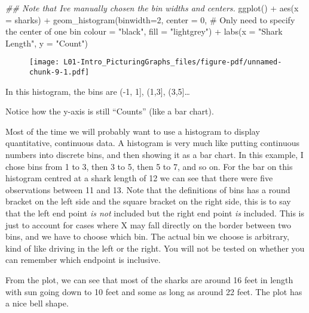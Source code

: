 \documentclass[
  letterpaper,
  DIV=11,
  numbers=noendperiod]{scrreprt}
\newenvironment{Shaded}{\begin{snugshade}}{\end{snugshade}}
\newcommand{\AttributeTok}[1]{\textcolor[rgb]{0.40,0.45,0.13}{#1}}
\newcommand{\CommentTok}[1]{\textcolor[rgb]{0.37,0.37,0.37}{#1}}
\newcommand{\DecValTok}[1]{\textcolor[rgb]{0.68,0.00,0.00}{#1}}
\newcommand{\DocumentationTok}[1]{\textcolor[rgb]{0.37,0.37,0.37}{\textit{#1}}}
\newcommand{\FunctionTok}[1]{\textcolor[rgb]{0.28,0.35,0.67}{#1}}
\newcommand{\NormalTok}[1]{\textcolor[rgb]{0.00,0.23,0.31}{#1}}
\newcommand{\SpecialCharTok}[1]{\textcolor[rgb]{0.37,0.37,0.37}{#1}}
\newcommand{\StringTok}[1]{\textcolor[rgb]{0.13,0.47,0.30}{#1}}
\begin{document}
\begin{Shaded}
\begin{Highlighting}[]
\DocumentationTok{\#\# Note that I\textquotesingle{}ve manually chosen the bin widths and centers.}
\FunctionTok{ggplot}\NormalTok{() }\SpecialCharTok{+} 
    \FunctionTok{aes}\NormalTok{(}\AttributeTok{x =}\NormalTok{ sharks) }\SpecialCharTok{+}
    \FunctionTok{geom\_histogram}\NormalTok{(}\AttributeTok{binwidth=}\DecValTok{2}\NormalTok{, }
        \AttributeTok{center =} \DecValTok{0}\NormalTok{, }\CommentTok{\# Only need to specify the center of one bin}
        \AttributeTok{colour =} \StringTok{"black"}\NormalTok{, }\AttributeTok{fill =} \StringTok{"lightgrey"}\NormalTok{) }\SpecialCharTok{+}
    \FunctionTok{labs}\NormalTok{(}\AttributeTok{x =} \StringTok{"Shark Length"}\NormalTok{, }\AttributeTok{y =} \StringTok{"Count"}\NormalTok{)}
\end{Highlighting}
\end{Shaded}

\begin{figure}[H]

{\centering \texttt{[image: L01-Intro\_PicturingGraphs\_files/figure-pdf/unnamed-chunk-9-1.pdf]}

}

\end{figure}

In this histogram, the bins are (-1, 1{]}, (1,3{]}, (3,5{]}\ldots{}

Notice how the y-axis is still ``Counts'' (like a bar chart).

Most of the time we will probably want to use a histogram to display
quantitative, continuous data. A histogram is very much like putting
continuous numbers into discrete bins, and then showing it as a bar
chart. In this example, I chose bins from 1 to 3, then 3 to 5, then 5 to
7, and so on. For the bar on this histogram centred at a shark length of
12 we can see that there were five observations between 11 and 13. Note
that the definitions of bins has a round bracket on the left side and
the square bracket on the right side, this is to say that the left end
point \emph{is not} included but the right end point \emph{is} included.
This is just to account for cases where X may fall directly on the
border between two bins, and we have to choose which bin. The actual bin
we choose is arbitrary, kind of like driving in the left or the right.
You will not be tested on whether you can remember which endpoint is
inclusive.

From the plot, we can see that most of the sharks are around 16 feet in
length with sun going down to 10 feet and some as long as around 22
feet. The plot has a nice bell shape.
\end{document}
